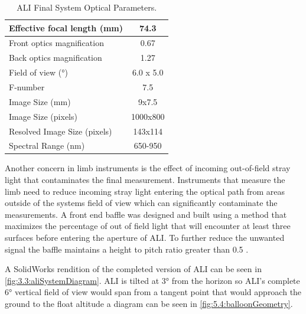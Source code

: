 \documentclass[12pt]{article}
\begin{document}
\begin{table}[!ht]
    \begin{center}
    \begin{tabular}{|l|c|}
      \hline
      Effective focal length (mm) & 74.3 \\
      \hline
      Front optics magnification & 0.67 \\
      \hline
      Back optics magnification & 1.27 \\
      \hline
      Field of view (\si{\degree}) & 6.0 x 5.0 \\
      \hline
      F-number & 7.5 \\
      \hline
      Image Size (mm) & 9x7.5\\
      \hline
      Image Size (pixels) & 1000x800\\
      \hline
      Resolved Image Size (pixels) & 143x114\\
      \hline
      Spectral Range (nm) & 650-950\\
      \hline
    \end{tabular}
    \end{center}
    \caption{ALI Final System Optical Parameters.}
    \label{tab:3.2:ALISystemParameters}
\end{table}

Another concern in limb instruments is the effect of incoming out-of-field stray light that contaminates the final measurement. Instruments that measure the limb need to reduce incoming stray light entering the optical path from areas outside of the systems field of view which can significantly contaminate the measurements. A front end baffle was designed and built using a method that maximizes the percentage of out of field light that will encounter at least three surfaces before entering the aperture of ALI. To further reduce the unwanted signal the baffle maintains a height to pitch ratio greater than 0.5 \citep{Fischer2008}.


A SolidWorks rendition of the completed version of ALI can be seen in \autoref{fig:3.3:aliSystemDiagram}. ALI is tilted at 3\si{\degree} from the horizon so ALI's complete 6\si{\degree} vertical field of view would span from a tangent point that would approach the ground to the float altitude a diagram can be seen in \autoref{fig:5.4:balloonGeometry}.
\end{document}
